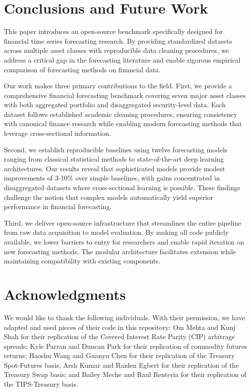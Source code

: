 \documentclass{article}
\begin{document}
\section{Conclusions and Future Work}
\label{sec:conclusion}

This paper introduces an open-source benchmark specifically designed for financial time series forecasting research. By providing standardized datasets across multiple asset classes with reproducible data cleaning procedures, we address a critical gap in the forecasting literature and enable rigorous empirical comparison of forecasting methods on financial data.

Our work makes three primary contributions to the field. First, we provide a comprehensive financial forecasting benchmark covering seven major asset classes with both aggregated portfolio and disaggregated security-level data. Each dataset follows established academic cleaning procedures, ensuring consistency with canonical finance research while enabling modern forecasting methods that leverage cross-sectional information.

Second, we establish reproducible baselines using twelve forecasting models ranging from classical statistical methods to state-of-the-art deep learning architectures. Our results reveal that sophisticated models provide modest improvements of 3-10\% over simple baselines, with gains concentrated in disaggregated datasets where cross-sectional learning is possible. These findings challenge the notion that complex models automatically yield superior performance in financial forecasting.

Third, we deliver open-source infrastructure that streamlines the entire pipeline from raw data acquisition to model evaluation. By making all code publicly available, we lower barriers to entry for researchers and enable rapid iteration on new forecasting methods. The modular architecture facilitates extension while maintaining compatibility with existing components.


\section*{Acknowledgments}

We would like to thank the following individuals. With their permission, we have adapted and used pieces of their code in this repository: Om Mehta and Kunj Shah for their replication of the Covered Interest Rate Parity (CIP) arbitrage spreads; Kyle Parran and Duncan Park for their replication of commodity futures returns; Haoshu Wang and Guanyu Chen for their replication of the Treasury Spot-Futures basis; Arsh Kumar and Raiden Egbert for their replication of the Treasury Swap basis; and Bailey Meche and Raul Renteria for their replication of the TIPS-Treasury basis.
\end{document}
